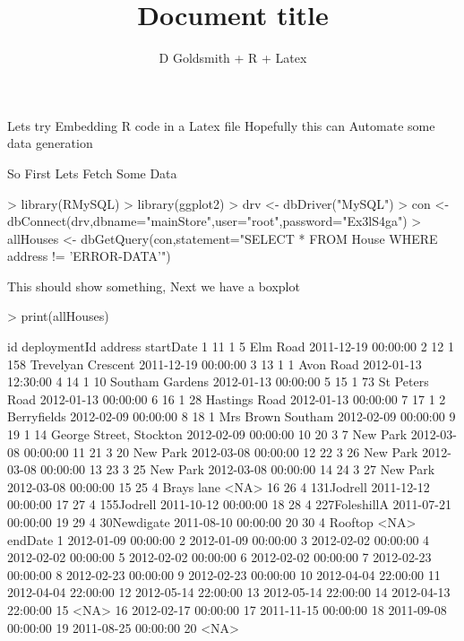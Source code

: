 \documentclass[12pt,a4paper]{article}
\title{Document title}
\author{D Goldsmith + R + Latex}
\begin{document}
\maketitle

Lets try Embedding R code in a Latex file
Hopefully this can Automate some data generation

So First Lets Fetch Some Data

\begin{Schunk}
\begin{Sinput}
> library(RMySQL)
> library(ggplot2)
> drv <- dbDriver("MySQL")
> con <- dbConnect(drv,dbname="mainStore",user="root",password="Ex3lS4ga")
> allHouses <-  dbGetQuery(con,statement="SELECT * FROM House WHERE address != 'ERROR-DATA'")
\end{Sinput}
\end{Schunk}

This should show something, 
Next we have a boxplot

\begin{Schunk}
\begin{Sinput}
> print(allHouses)
\end{Sinput}
\begin{Soutput}
   id deploymentId                    address           startDate
1  11            1                 5 Elm Road 2011-12-19 00:00:00
2  12            1     158 Trevelyan Crescent 2011-12-19 00:00:00
3  13            1                1 Avon Road 2012-01-13 12:30:00
4  14            1         10 Southam Gardens 2012-01-13 00:00:00
5  15            1          73 St Peters Road 2012-01-13 00:00:00
6  16            1           28 Hastings Road 2012-01-13 00:00:00
7  17            1              2 Berryfields 2012-02-09 00:00:00
8  18            1         Mrs Brown  Southam 2012-02-09 00:00:00
9  19            1 14 George Street, Stockton 2012-02-09 00:00:00
10 20            3                 7 New Park 2012-03-08 00:00:00
11 21            3                20 New Park 2012-03-08 00:00:00
12 22            3                26 New Park 2012-03-08 00:00:00
13 23            3                25 New Park 2012-03-08 00:00:00
14 24            3                27 New Park 2012-03-08 00:00:00
15 25            4                 Brays lane                <NA>
16 26            4                 131Jodrell 2011-12-12 00:00:00
17 27            4                 155Jodrell 2011-10-12 00:00:00
18 28            4              227FoleshillA 2011-07-21 00:00:00
19 29            4                30Newdigate 2011-08-10 00:00:00
20 30            4                    Rooftop                <NA>
               endDate
1  2012-01-09 00:00:00
2  2012-01-09 00:00:00
3  2012-02-02 00:00:00
4  2012-02-02 00:00:00
5  2012-02-02 00:00:00
6  2012-02-02 00:00:00
7  2012-02-23 00:00:00
8  2012-02-23 00:00:00
9  2012-02-23 00:00:00
10 2012-04-04 22:00:00
11 2012-04-04 22:00:00
12 2012-05-14 22:00:00
13 2012-05-14 22:00:00
14 2012-04-13 22:00:00
15                <NA>
16 2012-02-17 00:00:00
17 2011-11-15 00:00:00
18 2011-09-08 00:00:00
19 2011-08-25 00:00:00
20                <NA>
\end{Soutput}
\end{Schunk}
\end{document}
